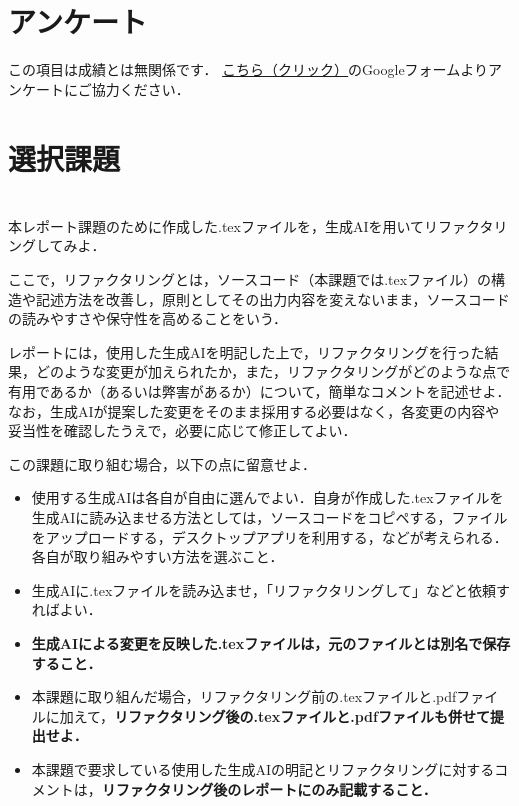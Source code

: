 \documentclass[a4paper,12pt]{jsarticle}
\begin{document}
\section*{アンケート}

この項目は成績とは無関係です．
\href{https://forms.gle/bKQ8Az1BiJJV5r6g6}{こちら（クリック）}のGoogleフォームよりアンケートにご協力ください．

\clearpage

\appendix
\renewcommand{\thesection}{\Alph{section}}

\section*{選択課題}

\section{}
\label{sec:ai_assist}

本レポート課題のために作成した.texファイルを，生成AIを用いてリファクタリングしてみよ．

ここで，リファクタリングとは，ソースコード（本課題では.texファイル）の構造や記述方法を改善し，原則としてその出力内容を変えないまま，ソースコードの読みやすさや保守性を高めることをいう．

レポートには，使用した生成AIを明記した上で，リファクタリングを行った結果，どのような変更が加えられたか，また，リファクタリングがどのような点で有用であるか（あるいは弊害があるか）について，簡単なコメントを記述せよ．なお，生成AIが提案した変更をそのまま採用する必要はなく，各変更の内容や妥当性を確認したうえで，必要に応じて修正してよい．

この課題に取り組む場合，以下の点に留意せよ．
\begin{itemize}
    \item 使用する生成AIは各自が自由に選んでよい．自身が作成した.texファイルを生成AIに読み込ませる方法としては，ソースコードをコピペする，ファイルをアップロードする，デスクトップアプリを利用する，などが考えられる．各自が取り組みやすい方法を選ぶこと．
    \item 生成AIに.texファイルを読み込ませ，「リファクタリングして」などと依頼すればよい．
    \item {\bf 生成AIによる変更を反映した.texファイルは，元のファイルとは別名で保存すること．}
    \item 本課題に取り組んだ場合，リファクタリング前の.texファイルと.pdfファイルに加えて，{\bf リファクタリング後の.texファイルと.pdfファイルも併せて提出せよ．}
    \item 本課題で要求している使用した生成AIの明記とリファクタリングに対するコメントは，{\bf リファクタリング後のレポートにのみ記載すること．}
\end{itemize}
\end{document}
